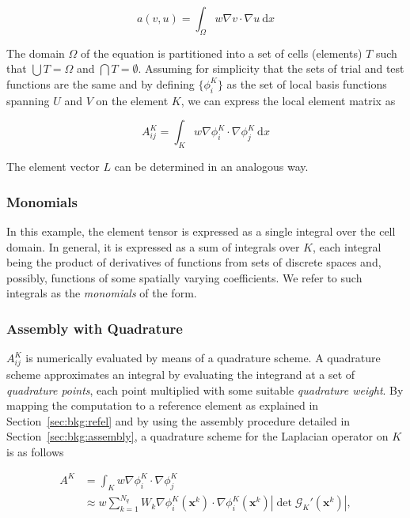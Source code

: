 \begin{equation}
\label{sec:bkg:eq:spec-laplacian}
a(v, u) = \int_\Omega w \nabla v \cdot \nabla u\ \mathrm{d}x
\end{equation}

The domain $\Omega$ of the equation is partitioned into a set of cells (elements) $T$ such that $\bigcup T = \Omega$ and $\bigcap T = \emptyset$. Assuming for simplicity that the sets of trial and test functions are the same and by defining $\lbrace \phi_i^K \rbrace$ as the set of local basis functions spanning $U$ and $V$ on the element $K$, we can express the local element matrix as

\begin{equation}
\label{sec:bkg:stiffness}
A_{ij}^K = \int_K w \nabla \phi_i^K \cdot \nabla \phi_j^K\ \mathrm{d}x
\end{equation}

The element vector $L$ can be determined in an analogous way. 

\subsubsection{Monomials}
\label{sec:bkg:monomials}
In this example, the element tensor is expressed as a single integral over the cell domain. In general, it is expressed as a sum of integrals over $K$, each integral being the product of derivatives of functions from sets of discrete spaces and, possibly, functions of some spatially varying coefficients. We refer to such integrals as the \textit{monomials} of the form. 

\subsubsection{Assembly with Quadrature}
$A_{ij}^K$ is numerically evaluated by means of a quadrature scheme. A quadrature scheme approximates an integral by evaluating the integrand at a set of {\em quadrature points}, each point multiplied with some suitable {\em quadrature weight}. By mapping the computation to a reference element as explained in Section~\ref{sec:bkg:refel} and by using the assembly procedure detailed in Section~\ref{sec:bkg:assembly}, a quadrature scheme for the Laplacian operator on $K$ is as follows

\begin{equation}
\begin{split}
A^K & = \int_K w \nabla \phi_i^K \cdot \nabla \phi_j^K \\
& \approx w \sum_{k=1}^{N_q} W_k \nabla \phi_i^K(\boldsymbol{x}^k) \cdot \nabla \phi_i^K (\boldsymbol{x}^k) | \operatorname{det} \mathcal{G}_K'(\boldsymbol{x}^k) |,
\end{split}
\end{equation} 

